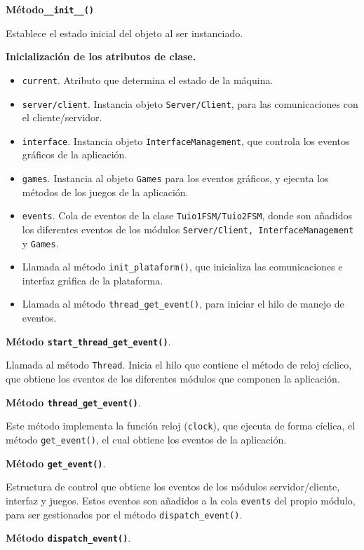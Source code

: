 \textbf{Método\texttt{\_\_init\_\_()}}

Establece el estado inicial del objeto al ser instanciado. 

\textbf{Inicialización de los atributos de clase.}

\begin{itemize}
\item \texttt{current}. Atributo que determina el estado de la máquina.
\item \texttt{server/client}. Instancia objeto \texttt{Server/Client}, para las comunicaciones con el cliente/servidor.
\item \texttt{interface}. Instancia objeto \texttt{InterfaceManagement}, que controla los eventos gráficos de la aplicación.
\item \texttt{games}. Instancia al objeto \texttt{Games} para los eventos gráficos, y ejecuta los métodos de los juegos de la aplicación.
\item \texttt{events}. Cola de eventos de la clase \texttt{Tuio1FSM/Tuio2FSM}, donde son añadidos los diferentes eventos de los módulos \texttt{Server/Client, InterfaceManagement} y \texttt{Games}.
\item Llamada al método \texttt{init\_plataform()}, que inicializa las comunicaciones e interfaz gráfica de la plataforma. 
\item Llamada al método \texttt{thread\_get\_event()}, para iniciar el hilo de manejo de eventos.
\end{itemize}

\textbf{Método \texttt{start\_thread\_get\_event()}}.

Llamada al método \texttt{Thread}. Inicia el hilo que contiene el método de reloj cíclico, que obtiene los eventos de los diferentes módulos que componen la aplicación.

\textbf{Método \texttt{thread\_get\_event()}}.

Este método implementa la función reloj (\texttt{clock}), que ejecuta de forma cíclica, el método \texttt{get\_event()}, el cual obtiene los eventos de la aplicación.

\textbf{Método \texttt{get\_event()}}.

Estructura de control que obtiene los eventos de los módulos servidor/cliente, interfaz y juegos.
Estos eventos son añadidos a la cola \texttt{events} del propio módulo, para ser gestionados por el método \texttt{dispatch\_event()}.

\textbf{Método \texttt{dispatch\_event()}}.

